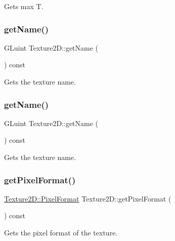 Gets max T. \mbox{\label{classTexture2D_a2190dbf64d30302d1a3626a799a3504c}} 
\subsubsection{\texorpdfstring{get\+Name()}{getName()}\hspace{0.1cm}{\footnotesize\ttfamily [1/2]}}
{\footnotesize\ttfamily G\+Luint Texture2\+D\+::get\+Name (\begin{DoxyParamCaption}{ }\end{DoxyParamCaption}) const}

Gets the texture name. \mbox{\label{classTexture2D_a2190dbf64d30302d1a3626a799a3504c}} 
\subsubsection{\texorpdfstring{get\+Name()}{getName()}\hspace{0.1cm}{\footnotesize\ttfamily [2/2]}}
{\footnotesize\ttfamily G\+Luint Texture2\+D\+::get\+Name (\begin{DoxyParamCaption}{ }\end{DoxyParamCaption}) const}

Gets the texture name. \mbox{\label{classTexture2D_a50abeeaa43511e402499c0e3c3c1ef22}} 
\subsubsection{\texorpdfstring{get\+Pixel\+Format()}{getPixelFormat()}\hspace{0.1cm}{\footnotesize\ttfamily [1/2]}}
{\footnotesize\ttfamily \hyperlink{classTexture2D_a45d9d8bb5a0669def36bbdfbfb91d220}{Texture2\+D\+::\+Pixel\+Format} Texture2\+D\+::get\+Pixel\+Format (\begin{DoxyParamCaption}{ }\end{DoxyParamCaption}) const}

Gets the pixel format of the texture. \mbox{\label{classTexture2D_a50abeeaa43511e402499c0e3c3c1ef22}} 
